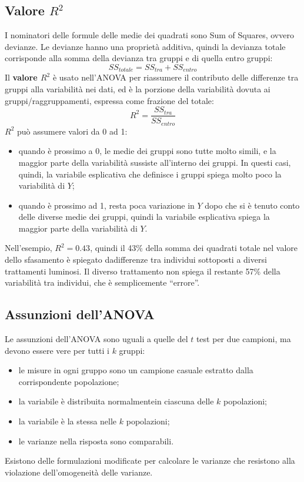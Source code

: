\documentclass[10pt, draft]{book}
\newcommand{\tightlist}{%
\setlength{\itemsep}{1pt}\setlength{\parskip}{0pt}\setlength{\parsep}{0pt}}
\begin{document}
\subsection{Valore \texorpdfstring{$R^2$}{Lg}}

I nominatori delle formule delle medie dei quadrati sono Sum of Squares, ovvero devianze. Le devianze hanno una proprietà additiva, quindi la devianza totale corrisponde alla somma della devianza tra gruppi e di quella entro gruppi:
\begin{equation}
    SS_{totale} = SS_{tra}+SS_{entro}
\end{equation}
Il \textbf{valore $R^2$} è usato nell'ANOVA per riassumere il contributo delle differenze tra gruppi alla variabilità nei dati, ed è la porzione della variabilità dovuta ai gruppi/raggruppamenti, espressa come frazione del totale:
\begin{equation}
    R^2 = \frac{SS_{tra}}{SS_{entro}}
\end{equation}
$R^2$ può assumere valori da 0 ad 1:
\begin{itemize}\tightlist
    \item quando è prossimo a 0, le medie dei gruppi sono tutte molto simili, e la maggior parte della variabilità sussiste all'interno dei gruppi. In questi casi, quindi, la variabile esplicativa che definisce i gruppi spiega molto poco la variabilità di $Y$;
    \item quando è prossimo ad 1, resta poca variazione in $Y$ dopo che si è tenuto conto delle diverse medie dei gruppi, quindi la variabile esplicativa spiega la maggior parte della variabilità di $Y$.
\end{itemize}
Nell'esempio, $R^2 = 0.43$, quindi il 43\% della somma dei quadrati totale nel valore dello sfasamento è spiegato dadifferenze tra individui sottoposti a diversi trattamenti luminosi. Il diverso trattamento non spiega il restante 57\% della variabilità tra individui, che è semplicemente ``errore''.

\subsection{Assunzioni dell'ANOVA}

Le assunzioni dell'ANOVA sono uguali a quelle del $t$ test per due campioni, ma devono essere vere per tutti i $k$ gruppi:
\begin{itemize}\tightlist
    \item le misure in ogni gruppo sono un campione casuale estratto dalla corrispondente popolazione;
    \item la variabile è distribuita normalmentein ciascuna delle $k$ popolazioni;
    \item la variabile è la stessa nelle $k$ popolazioni;
    \item le varianze nella risposta sono comparabili.
\end{itemize}
Esistono delle formulazioni modificate per calcolare le varianze che resistono alla violazione dell'omogeneità delle varianze.\\
\end{document}
